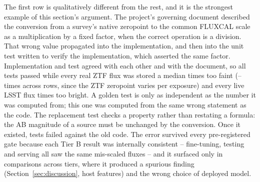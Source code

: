 The first row is qualitatively different from the rest, and it is the
strongest example of this section's argument. The project's governing
document described the conversion from a survey's native zeropoint to the
common FLUXCAL scale as a multiplication by a fixed factor, when the
correct operation is a division. That wrong value propagated into the
implementation, and then into the unit test written to verify the
implementation, which asserted the same factor. Implementation and test
agreed with each other and with the document, so all \TestsPassedPreFix{}
tests passed while every real ZTF flux was stored a median
\FluxBugFactor{} times too faint (\FluxBugFactorLow{}--\FluxBugFactorHigh{}
times across rows, since the ZTF zeropoint varies per exposure) and every
live LSST flux \LsstInversionFactor{} times too bright. A golden test is
only as independent as the number it was computed from; this one was
computed from the same wrong statement as the code. The replacement test
checks a property rather than restating a formula: the AB magnitude of a
source must be unchanged by the conversion. Once it existed,
\TestsFailedInvarianceOnOldCode{} tests failed against the old code. The
error survived every pre-registered gate because each Tier B result was
internally consistent -- fine-tuning, testing and serving all saw the same
mis-scaled fluxes -- and it surfaced only in comparisons across tiers,
where it produced a spurious finding (Section~\ref{sec:discussion}, host
features) and the wrong choice of deployed model.

